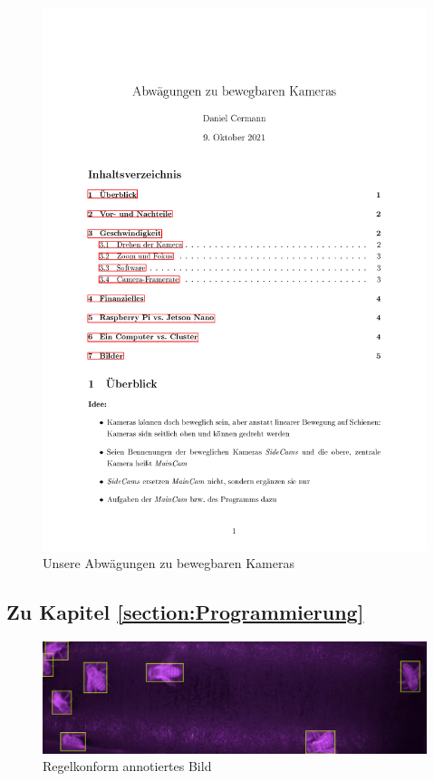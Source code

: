 \documentclass[11pt,a4paper]{article}
\begin{document}
\begin{figure}[H]
    \includegraphics[page=4, scale=.3]{images/TPZ_Cameras_Idea.pdf}    
    \caption{Unsere Abwägungen zu bewegbaren Kameras}
    \label{fig:moving_cameras_considerations}
\end{figure}

\subsection{Zu Kapitel \autoref{section:Programmierung}}
\begin{figure}[!htb] \label{annotated1}
    \centering
	    \includegraphics[width = .8\textwidth]{images/annotated1.png}
        \caption{Regelkonform annotiertes Bild}
\end{figure}
\end{document}
